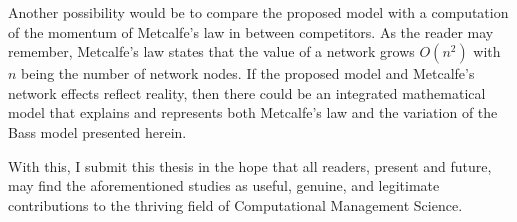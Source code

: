 Another possibility would be to compare the proposed model with a computation of the momentum of Metcalfe’s law in between competitors.  As the reader may remember, Metcalfe’s law states that the value of a network grows $O(n^2)$ with $n$ being the number of network nodes.   If the proposed model and Metcalfe’s network effects reflect reality, then there could be an integrated mathematical model that explains and represents both Metcalfe’s law and the variation of the Bass model presented herein.  

With this, I submit this thesis in the hope that all readers, present and future, may find the aforementioned studies as useful, genuine, and legitimate contributions to the thriving field of Computational Management Science.
